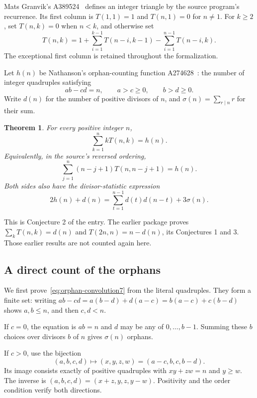 \documentclass[11pt]{article}
\newtheorem{theorem}{Theorem}[section]
\begin{document}
Mats Granvik's A389524~\cite{A389524} defines an integer triangle by the
source program's recurrence. Its first column is $T(1,1)=1$ and
$T(n,1)=0$ for $n\ne1$. For $k\ge2$, set $T(n,k)=0$ when $n<k$, and
otherwise set
\begin{equation}\label{eq:triangle7}
T(n,k)=1+\sum_{i=1}^{k-1}T(n-i,k-1)
          -\sum_{i=1}^{n-1}T(n-i,k).
\end{equation}
The exceptional first column is retained throughout the formalization.

Let $h(n)$ be Nathanson's orphan-counting function A274628~\cite{A274628}:
the number of integer quadruples satisfying
\[
ab-cd=n,\qquad a>c\ge0,\qquad b>d\ge0.
\]
Write $d(n)$ for the number of positive divisors of $n$, and
$\sigma(n)=\sum_{r\mid n}r$ for their sum.

\begin{theorem}\label{thm:weighted7}
For every positive integer $n$,
\[
\boxed{\sum_{k=1}^{n}kT(n,k)=h(n).}
\]
Equivalently, in the source's reversed ordering,
\[
\sum_{j=1}^{n}(n-j+1)T(n,n-j+1)=h(n).
\]
Both sides also have the divisor-statistic expression
\begin{equation}\label{eq:orphan-convolution7}
2h(n)+d(n)=\sum_{t=1}^{n-1}d(t)d(n-t)+3\sigma(n).
\end{equation}
\end{theorem}

This is Conjecture 2 of the entry. The earlier package proves
$\sum_kT(n,k)=d(n)$ and $T(2n,n)=n-d(n)$, its Conjectures 1 and 3.
Those earlier results are not counted again here.

\subsection{A direct count of the orphans}

We first prove~\eqref{eq:orphan-convolution7} from the literal quadruples.
They form a finite set: writing
$ab-cd=a(b-d)+d(a-c)=b(a-c)+c(b-d)$ shows $a,b\le n$, and then
$c,d<n$.

If $c=0$, the equation is $ab=n$ and $d$ may be any of
$0,\ldots,b-1$. Summing these $b$ choices over divisors $b$ of $n$
gives $\sigma(n)$ orphans.

If $c>0$, use the bijection
\[
(a,b,c,d)\longmapsto(x,y,z,w)=(a-c,b,c,b-d).
\]
Its image consists exactly of positive quadruples with
$xy+zw=n$ and $y\ge w$. The inverse is
$(a,b,c,d)=(x+z,y,z,y-w)$. Positivity and the order condition verify
both directions.
\end{document}
